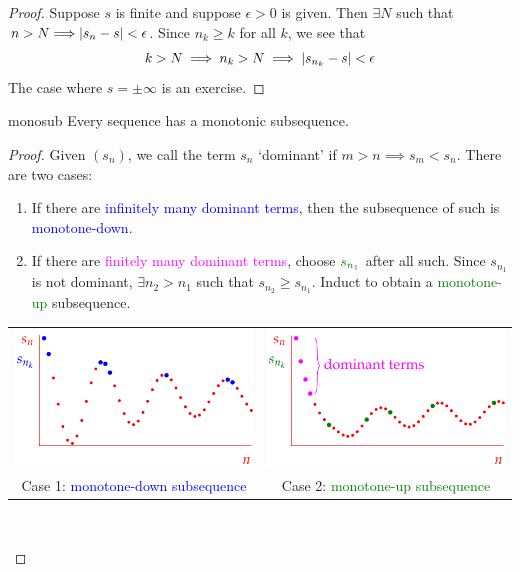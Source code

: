 \begin{proof}
	Suppose $s$ is finite and suppose $\epsilon>0$ is given. Then $\exists N$ such that $n>N\Longrightarrow \left| s_n-s\right|<\epsilon$. Since $n_k\ge k$ for all $k$, we see that
	\[
		k>N\implies n_k>N\implies \left| s_{n_k}-s\right|<\epsilon
	\]
	The case where $s=\pm\infty$ is an exercise.
\end{proof}


\begin{lemm}{}{monosub}
	Every sequence has a monotonic subsequence.
\end{lemm}

\begin{proof}
	Given $(s_n)$, we call the term $s_n$ `dominant' if $m>n\implies s_m<s_n$. There are two cases:
\begin{enumerate}\itemsep0pt
  \item If there are \textcolor{blue}{infinitely many dominant terms}, then the subsequence of such is \textcolor{blue}{monotone-down}.
  \item If there are \textcolor{magenta}{finitely many dominant terms}, choose $\textcolor{Green}{s_{n_1}}$ after all such. Since $s_{n_1}$ is not dominant, $\exists n_2>n_1$ such that $s_{n_2}\ge s_{n_1}$. Induct to obtain a \textcolor{Green}{monotone-up} subsequence.
  \end{enumerate}
  
	\begin{center}
		\begin{tabular}{c@{\qquad}c}
	  	\includegraphics[scale=0.95]{dominant1}&
	  	\includegraphics[scale=0.95]{dominant2}\\[-3pt]
	  	Case 1: \textcolor{blue}{monotone-down subsequence}&Case 2: \textcolor{Green}{monotone-up subsequence}
	  \end{tabular}\\[-8pt]
	  \hfill\qedhere
	\end{center}
\end{proof}


